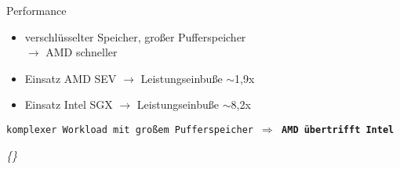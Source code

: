 \documentclass{sdqbeamer}
\begin{document}
\begin{frame}{Performance}
	\begin{itemize}
		\item verschlüsselter Speicher, großer Pufferspeicher \\ \(\rightarrow\) AMD schneller
		\item Einsatz AMD SEV \(\rightarrow\) Leistungseinbuße \begin{math} \sim \end{math}1,9x
		\item Einsatz Intel SGX  \(\rightarrow\) Leistungseinbuße \begin{math} \sim \end{math}8,2x
	\end{itemize}

	\begin{greenblock}{}
		\texttt{komplexer Workload mit großem Pufferspeicher \(\Rightarrow\) \textbf{AMD übertrifft Intel}}
		\end{greenblock}
	
	\vfill
	\textit{\{\cite{mofrad}\}}
\end{frame}
\end{document}
